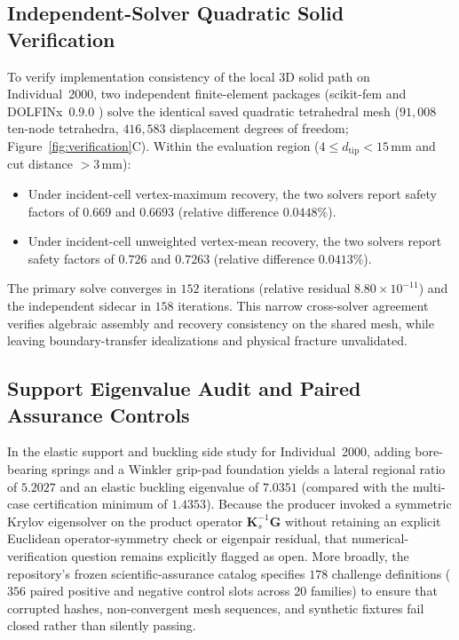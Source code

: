 \subsection{Independent-Solver Quadratic Solid Verification}
To verify implementation consistency of the local 3D solid path on Individual~2000, two independent finite-element packages (scikit-fem \cite{skfem} and DOLFINx~0.9.0 \cite{dolfinx}) solve the identical saved quadratic tetrahedral mesh ($91{,}008$ ten-node tetrahedra, $416{,}583$ displacement degrees of freedom; Figure~\ref{fig:verification}C). Within the evaluation region ($4\le d_{\text{tip}} < 15\,\mathrm{mm}$ and cut distance $> 3\,\mathrm{mm}$):
\begin{itemize}[leftmargin=*,nosep]
\item Under incident-cell vertex-maximum recovery, the two solvers report safety factors of $0.669$ and $0.6693$ (relative difference $0.0448\%$).
\item Under incident-cell unweighted vertex-mean recovery, the two solvers report safety factors of $0.726$ and $0.7263$ (relative difference $0.0413\%$).
\end{itemize}
The primary solve converges in $152$ iterations (relative residual $8.80\times 10^{-11}$) and the independent sidecar in $158$ iterations. This narrow cross-solver agreement verifies algebraic assembly and recovery consistency on the shared mesh, while leaving boundary-transfer idealizations and physical fracture unvalidated.

\subsection{Support Eigenvalue Audit and Paired Assurance Controls}
In the elastic support and buckling side study for Individual~2000, adding bore-bearing springs and a Winkler grip-pad foundation yields a lateral regional ratio of $5.2027$ and an elastic buckling eigenvalue of $7.0351$ (compared with the multi-case certification minimum of $1.4353$). Because the producer invoked a symmetric Krylov eigensolver on the product operator $\mathbf K_s^{-1}\mathbf G$ without retaining an explicit Euclidean operator-symmetry check or eigenpair residual, that numerical-verification question remains explicitly flagged as open. More broadly, the repository's frozen scientific-assurance catalog specifies $178$ challenge definitions ($356$ paired positive and negative control slots across 20 families) to ensure that corrupted hashes, non-convergent mesh sequences, and synthetic fixtures fail closed rather than silently passing.
